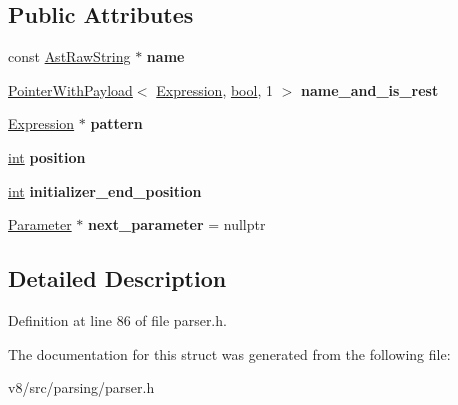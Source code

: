 \subsection*{Public Attributes}
\begin{DoxyCompactItemize}
\item 
\mbox{\label{structv8_1_1internal_1_1ParserFormalParameters_1_1Parameter_a4542eee131539b3094d7cad38caadf9f}} 
const \mbox{\hyperlink{classv8_1_1internal_1_1AstRawString}{Ast\+Raw\+String}} $\ast$ {\bfseries name}
\item 
\mbox{\label{structv8_1_1internal_1_1ParserFormalParameters_1_1Parameter_a52d44764c9580bbca8b3e44b66ba5327}} 
\mbox{\hyperlink{classv8_1_1internal_1_1PointerWithPayload}{Pointer\+With\+Payload}}$<$ \mbox{\hyperlink{classv8_1_1internal_1_1Expression}{Expression}}, \mbox{\hyperlink{classbool}{bool}}, 1 $>$ {\bfseries name\+\_\+and\+\_\+is\+\_\+rest}
\item 
\mbox{\label{structv8_1_1internal_1_1ParserFormalParameters_1_1Parameter_ab85c3c02df00b3d6a0ca3ee470fe7707}} 
\mbox{\hyperlink{classv8_1_1internal_1_1Expression}{Expression}} $\ast$ {\bfseries pattern}
\item 
\mbox{\label{structv8_1_1internal_1_1ParserFormalParameters_1_1Parameter_ade3301a60a715d7c0cf8016cb68d7c10}} 
\mbox{\hyperlink{classint}{int}} {\bfseries position}
\item 
\mbox{\label{structv8_1_1internal_1_1ParserFormalParameters_1_1Parameter_acba18a85e07618372f8f3e165157e8a8}} 
\mbox{\hyperlink{classint}{int}} {\bfseries initializer\+\_\+end\+\_\+position}
\item 
\mbox{\label{structv8_1_1internal_1_1ParserFormalParameters_1_1Parameter_a5521295181858146555b5494d3530d62}} 
\mbox{\hyperlink{structv8_1_1internal_1_1ParserFormalParameters_1_1Parameter}{Parameter}} $\ast$ {\bfseries next\+\_\+parameter} = nullptr
\end{DoxyCompactItemize}


\subsection{Detailed Description}


Definition at line 86 of file parser.\+h.



The documentation for this struct was generated from the following file\+:\begin{DoxyCompactItemize}
\item 
v8/src/parsing/parser.\+h\end{DoxyCompactItemize}
